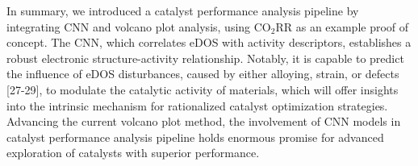 In summary, we introduced a catalyst performance analysis pipeline by integrating CNN and volcano plot analysis, using CO$_2$RR as an example proof of concept.
The CNN, which correlates eDOS with activity descriptors, establishes a robust electronic structure-activity relationship.
Notably, it is capable to predict the influence of eDOS disturbances, caused by either alloying, strain, or defects [27-29], to modulate the catalytic activity of materials, which will offer insights into the intrinsic mechanism for rationalized catalyst optimization strategies.
Advancing the current volcano plot method, the involvement of CNN models in catalyst performance analysis pipeline holds enormous promise for advanced exploration of catalysts with superior performance.
